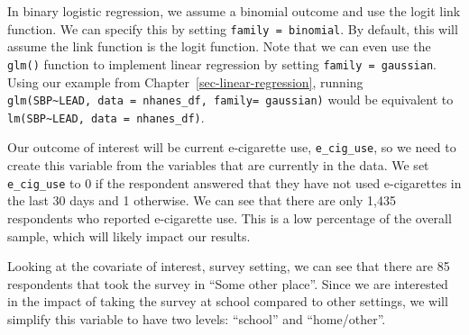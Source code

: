 \documentclass[
  letterpaper,
]{krantz}
\makeatletter
\newenvironment{Shaded}{\begin{snugshade}}{\end{snugshade}}
\newcommand{\CommentTok}[1]{\textcolor[rgb]{0.37,0.37,0.37}{#1}}
\newcommand{\DecValTok}[1]{\textcolor[rgb]{0.68,0.00,0.00}{#1}}
\newcommand{\FunctionTok}[1]{\textcolor[rgb]{0.28,0.35,0.67}{#1}}
\newcommand{\NormalTok}[1]{\textcolor[rgb]{0.00,0.23,0.31}{#1}}
\newcommand{\OtherTok}[1]{\textcolor[rgb]{0.00,0.23,0.31}{#1}}
\newcommand{\SpecialCharTok}[1]{\textcolor[rgb]{0.37,0.37,0.37}{#1}}
\newcommand{\StringTok}[1]{\textcolor[rgb]{0.13,0.47,0.30}{#1}}
\newenvironment{kframe}{%
\medskip{}
\setlength{\fboxsep}{.8em}
 \def\at@end@of@kframe{}%
 \ifinner\ifhmode%
  \def\at@end@of@kframe{\end{minipage}}%
  \begin{minipage}{\columnwidth}%
 \fi\fi%
 \def\FrameCommand##1{\hskip\@totalleftmargin \hskip-\fboxsep
 \colorbox{shadecolor}{##1}\hskip-\fboxsep
     \hskip-\linewidth \hskip-\@totalleftmargin \hskip\columnwidth}%
 \MakeFramed {\advance\hsize-\width
   \@totalleftmargin\z@ \linewidth\hsize
   \@setminipage}}%
 {\par\unskip\endMakeFramed%
 \at@end@of@kframe}
\renewenvironment{Shaded}{\begin{kframe}}{\end{kframe}}
\makeatother
\begin{document}
In binary logistic regression, we assume a binomial outcome and use the
logit link function. We can specify this by setting
\texttt{family\ =\ binomial}. By default, this will assume the link
function is the logit function. Note that we can even use the
\texttt{glm()} function to implement linear regression by setting
\texttt{family\ =\ gaussian}. Using our example from
Chapter~\ref{sec-linear-regression}, running
\texttt{glm(SBP\textasciitilde{}LEAD,\ data\ =\ nhanes\_df,\ family=\ gaussian)}
would be equivalent to
\texttt{lm(SBP\textasciitilde{}LEAD,\ data\ =\ nhanes\_df)}.

Our outcome of interest will be current e-cigarette use,
\texttt{e\_cig\_use}, so we need to create this variable from the
variables that are currently in the data. We set \texttt{e\_cig\_use} to
0 if the respondent answered that they have not used e-cigarettes in the
last 30 days and 1 otherwise. We can see that there are only 1,435
respondents who reported e-cigarette use. This is a low percentage of
the overall sample, which will likely impact our results.

\begin{Shaded}
\end{Shaded}

Looking at the covariate of interest, survey setting, we can see that
there are 85 respondents that took the survey in ``Some other place''.
Since we are interested in the impact of taking the survey at school
compared to other settings, we will simplify this variable to have two
levels: ``school'' and ``home/other''.
\end{document}
